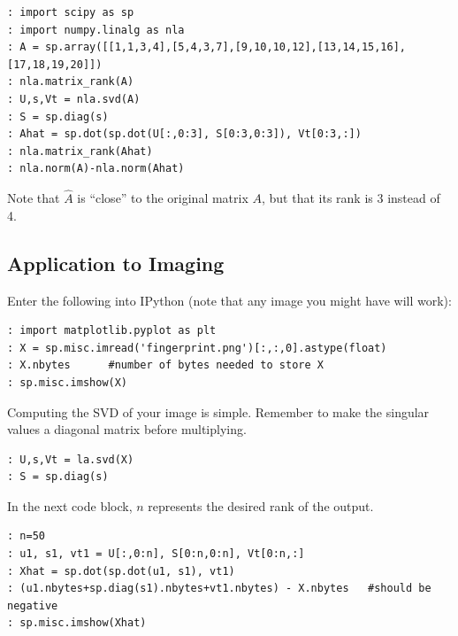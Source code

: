 \begin{lstlisting}[style=python]
: import scipy as sp
: import numpy.linalg as nla
: A = sp.array([[1,1,3,4],[5,4,3,7],[9,10,10,12],[13,14,15,16],[17,18,19,20]])
: nla.matrix_rank(A)
: U,s,Vt = nla.svd(A)
: S = sp.diag(s)
: Ahat = sp.dot(sp.dot(U[:,0:3], S[0:3,0:3]), Vt[0:3,:])
: nla.matrix_rank(Ahat)
: nla.norm(A)-nla.norm(Ahat)
\end{lstlisting}


Note that $\widehat A$ is ``close'' to the original matrix $A$, but
that its rank is 3 instead of 4.

\subsection*{Application to Imaging}


Enter the following into IPython (note that any image you might have will work):
\begin{lstlisting}
: import matplotlib.pyplot as plt
: X = sp.misc.imread('fingerprint.png')[:,:,0].astype(float)
: X.nbytes      #number of bytes needed to store X
: sp.misc.imshow(X)
\end{lstlisting}
Computing the SVD of your image is simple.  Remember to make the singular values a diagonal matrix before multiplying.
\begin{lstlisting}
: U,s,Vt = la.svd(X)
: S = sp.diag(s)
\end{lstlisting}
In the next code block, $n$ represents the desired rank of the output.
\begin{lstlisting}
: n=50
: u1, s1, vt1 = U[:,0:n], S[0:n,0:n], Vt[0:n,:]
: Xhat = sp.dot(sp.dot(u1, s1), vt1)
: (u1.nbytes+sp.diag(s1).nbytes+vt1.nbytes) - X.nbytes   #should be negative
: sp.misc.imshow(Xhat)
\end{lstlisting}

